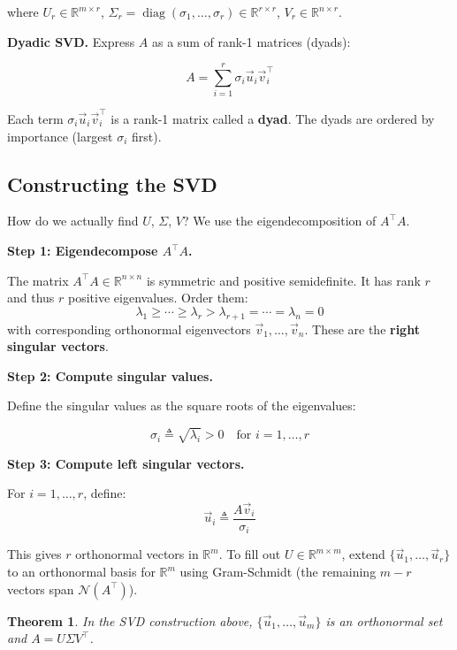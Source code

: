 \documentclass[10pt, twocolumn]{article}
\theoremstyle{definition}
\theoremstyle{plain}
\newtheorem{theorem}{Theorem}
\newcommand{\RR}{\mathbb{R}}
\newcommand{\NN}{\mathcal{N}}
\DeclareMathOperator{\diag}{diag}
\begin{document}
where $U_r \in \RR^{m \times r}$, $\Sigma_r = \diag(\sigma_1, \ldots, \sigma_r) \in \RR^{r \times r}$, $V_r \in \RR^{n \times r}$.

\textbf{Dyadic SVD.} Express $A$ as a sum of rank-1 matrices (dyads):

\begin{result}
\[
    A = \sum_{i=1}^{r} \sigma_i \vec{u}_i \vec{v}_i^\top
\]
\end{result}

Each term $\sigma_i \vec{u}_i \vec{v}_i^\top$ is a rank-1 matrix called a \textbf{dyad}. The dyads are ordered by importance (largest $\sigma_i$ first).

\subsection{Constructing the SVD}

How do we actually find $U$, $\Sigma$, $V$? We use the eigendecomposition of $A^\top A$.

\textbf{Step 1: Eigendecompose $A^\top A$.}

The matrix $A^\top A \in \RR^{n \times n}$ is symmetric and positive semidefinite. It has rank $r$ and thus $r$ positive eigenvalues. Order them:
\[
    \lambda_1 \ge \cdots \ge \lambda_r > \lambda_{r+1} = \cdots = \lambda_n = 0
\]
with corresponding orthonormal eigenvectors $\vec{v}_1, \ldots, \vec{v}_n$. These are the \textbf{right singular vectors}.

\textbf{Step 2: Compute singular values.}

Define the singular values as the square roots of the eigenvalues:
\begin{result}
\[
    \sigma_i \triangleq \sqrt{\lambda_i} > 0 \quad \text{for } i = 1, \ldots, r
\]
\end{result}

\textbf{Step 3: Compute left singular vectors.}

For $i = 1, \ldots, r$, define:
\[
    \vec{u}_i \triangleq \frac{A\vec{v}_i}{\sigma_i}
\]

This gives $r$ orthonormal vectors in $\RR^m$. To fill out $U \in \RR^{m \times m}$, extend $\{\vec{u}_1, \ldots, \vec{u}_r\}$ to an orthonormal basis for $\RR^m$ using Gram-Schmidt (the remaining $m - r$ vectors span $\NN(A^\top)$).

\begin{theorem}
In the SVD construction above, $\{\vec{u}_1, \ldots, \vec{u}_m\}$ is an orthonormal set and $A = U\Sigma V^\top$.
\end{theorem}
\end{document}
